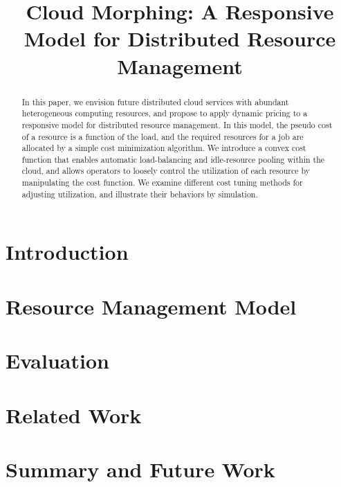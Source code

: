 \documentclass[10pt,sigconf,letterpaper,anonymous,nonacm]{acmart}
\title{Cloud Morphing: A Responsive Model for Distributed Resource Management}
\begin{document}
\begin{abstract}

    In this paper, we envision future distributed cloud services with
    abundant heterogeneous computing resources,
    and propose to apply dynamic pricing to a responsive model for
    distributed resource management.
    In this model, the pseudo cost of a resource is a function of the
    load, and the required resources for a job are allocated by a simple
    cost minimization algorithm.
    We introduce a convex cost function that enables automatic
    load-balancing and idle-resource pooling within the cloud, and allows
    operators to loosely control the utilization of each resource by
    manipulating the cost function. We examine different cost tuning
    methods for adjusting utilization, and illustrate their behaviors by
    simulation.

\end{abstract}

\maketitle

\section{Introduction}



\section{Resource Management Model}



\section{Evaluation}



\section{Related Work}



\section{Summary and Future Work}





\end{document}
